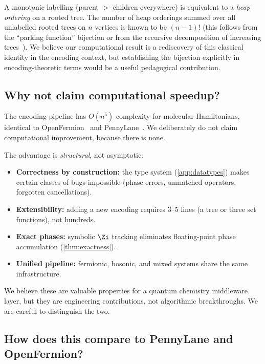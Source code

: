 A monotonic labelling (parent $>$ children everywhere) is equivalent
to a \emph{heap ordering} on a rooted tree.  The number of heap
orderings summed over all unlabelled rooted trees on $n$ vertices is
known to be $(n{-}1)!$ (this follows from the ``parking function''
bijection or from the recursive decomposition of increasing
trees~\cite{bergeron1992}).  We believe our computational result
is a rediscovery of this classical identity in the encoding context,
but establishing the bijection explicitly in encoding-theoretic
terms would be a useful pedagogical contribution.

\subsection{Why not claim computational speedup?}
\label{sec:concern-speedup}

The encoding pipeline has $O(n^5)$ complexity for molecular
Hamiltonians, identical to OpenFermion~\cite{mcclean2020} and
PennyLane~\cite{bergholm2022}.  We deliberately do not claim
computational improvement, because there is none.

The advantage is \emph{structural}, not asymptotic:
\begin{itemize}
  \item \textbf{Correctness by construction:} the type system
    (\cref{app:datatypes}) makes certain classes of bugs
    impossible (phase errors, unmatched operators, forgotten
    cancellations).
  \item \textbf{Extensibility:} adding a new encoding requires
    3--5 lines (a tree or three set functions), not hundreds.
  \item \textbf{Exact phases:} symbolic $\Zi$ tracking eliminates
    floating-point phase accumulation (\cref{thm:exactness}).
  \item \textbf{Unified pipeline:} fermionic, bosonic, and mixed
    systems share the same infrastructure.
\end{itemize}

We believe these are valuable properties for a quantum chemistry
middleware layer, but they are engineering contributions, not
algorithmic breakthroughs.  We are careful to distinguish the two.

\subsection{How does this compare to PennyLane and OpenFermion?}
\label{sec:concern-comparison}

